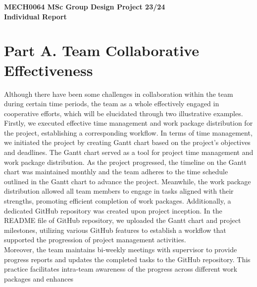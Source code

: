 \documentclass[11pt]{report} %
\begin{document}
\begin{center}
        \Large %
        \textbf{ MECH0064 MSc Group Design Project 23/24 \\}
        \huge
        \textbf{Individual Report}
\end{center}




\vspace{-8mm}
\section*{Part A. Team Collaborative Effectiveness} 
\vspace{-3mm}
Although there have been some challenges in collaboration within the 
team during certain time periods, the team as a whole effectively 
engaged in cooperative efforts, which will be elucidated through 
two illustrative examples. \\
Firstly, we executed effective time management and work package 
distribution for the project, establishing a corresponding workflow. 
In terms of time management, we initiated the project by creating 
Gantt chart based on the project's objectives and deadlines. 
The Gantt chart served as a tool for project time management and 
work package distribution. As the project progressed, the timeline 
on the Gantt chart was maintained monthly and the team adheres to 
the time schedule outlined in the Gantt chart to advance the project.
Meanwhile, the work package distribution allowed all team members 
to engage in tasks aligned with their strengths, promoting efficient 
completion of work packages. Additionally, a dedicated GitHub 
repository was created upon project inception. In the README file 
of GitHub repository, we uploaded the Gantt chart and project 
milestones, utilizing various GitHub features to establish a 
workflow that supported the progression of project management 
activities. \\
Moreover, the team maintains bi-weekly meetings with supervisor to 
provide progress reports and updates the completed tasks to the 
GitHub repository. This practice facilitates intra-team awareness 
of the progress across different work packages and enhances 
\end{document}
